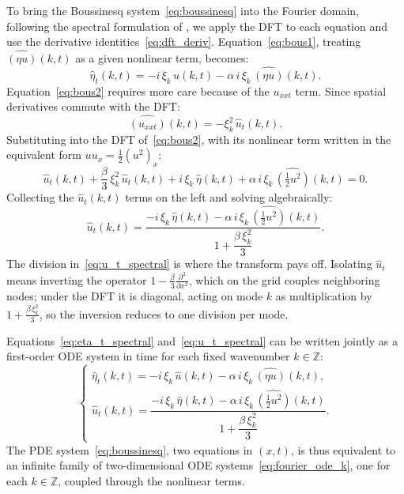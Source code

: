 To bring the Boussinesq system~\eqref{eq:boussinesq} into the Fourier domain, following the spectral formulation of \textcite{martins2023}, we apply the DFT to each equation and use the derivative identities~\eqref{eq:dft_deriv}. Equation~\eqref{eq:bous1}, treating $\widehat{(\eta u)}(k,t)$ as a given nonlinear term, becomes:
\begin{equation}\label{eq:eta_t_spectral}
    \hat{\eta}_t(k,t) = -i\,\xi_k\,\hat{u}(k,t)
    - \alpha\, i\,\xi_k\,\widehat{(\eta u)}(k,t).
\end{equation}
Equation~\eqref{eq:bous2} requires more care because of the $u_{xxt}$ term. Since spatial derivatives commute with the DFT:
\begin{equation*}
    \widehat{(u_{xxt})}(k,t) = -\xi_k^2\,\hat{u}_t(k,t).
\end{equation*}
Substituting into the DFT of~\eqref{eq:bous2}, with its nonlinear term written in the equivalent form $u u_x = \frac{1}{2}(u^2)_x$:
\begin{equation*}
    \hat{u}_t(k,t) + \frac{\beta}{3}\,\xi_k^2\,\hat{u}_t(k,t)
    + i\,\xi_k\,\hat{\eta}(k,t)
    + \alpha\, i\,\xi_k\,\widehat{\!\left(\tfrac{1}{2}u^2\right)}(k,t) = 0.
\end{equation*}
Collecting the $\hat{u}_t(k,t)$ terms on the left and solving algebraically:
\begin{equation}\label{eq:u_t_spectral}
    \hat{u}_t(k,t) = \frac{
        -i\,\xi_k\,\hat{\eta}(k,t)
        - \alpha\, i\,\xi_k\,\widehat{\!\left(\tfrac{1}{2}u^2\right)}(k,t)
    }{
        1 + \dfrac{\beta\,\xi_k^2}{3}
    }.
\end{equation}
The division in~\eqref{eq:u_t_spectral} is where the transform pays off. Isolating $\hat{u}_t$ means inverting the operator $1 - \frac{\beta}{3}\frac{\partial^2}{\partial x^2}$, which on the grid couples neighboring nodes; under the DFT it is diagonal, acting on mode $k$ as multiplication by $1 + \frac{\beta\,\xi_k^2}{3}$, so the inversion reduces to one division per mode.

Equations~\eqref{eq:eta_t_spectral} and~\eqref{eq:u_t_spectral} can be written jointly as a first-order ODE system in time for each fixed wavenumber $k \in \mathbb{Z}$:
\begin{equation}\label{eq:fourier_ode_k}
\begin{cases}
    \hat{\eta}_t(k,t) = -i\,\xi_k\,\hat{u}(k,t) - \alpha\,i\,\xi_k\,\widehat{(\eta u)}(k,t), \\[8pt]
    \hat{u}_t(k,t) = \dfrac{-i\,\xi_k\,\hat{\eta}(k,t) - \alpha\,i\,\xi_k\,\widehat{\!\left(\tfrac{1}{2}u^2\right)}\!(k,t)}{1 + \dfrac{\beta\,\xi_k^2}{3}}.
\end{cases}
\end{equation}
The PDE system~\eqref{eq:boussinesq}, two equations in $(x,t)$, is thus equivalent to an infinite family of two-dimensional ODE systems~\eqref{eq:fourier_ode_k}, one for each $k \in \mathbb{Z}$, coupled through the nonlinear terms.

